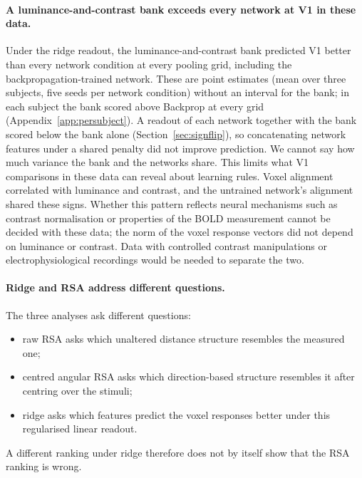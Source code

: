 \paragraph{A luminance-and-contrast bank exceeds every network at V1 in these data.}
Under the ridge readout, the luminance-and-contrast bank predicted V1 better than every
network condition at every pooling grid, including the backpropagation-trained network.
These are point estimates (mean over three subjects, five seeds per network condition)
without an interval for the bank; in each subject the bank scored above Backprop at every
grid (Appendix~\ref{app:persubject}). A readout of each network together with the bank
scored below the bank alone (Section~\ref{sec:signflip}), so concatenating network features under a shared penalty did not improve prediction. We cannot say how much variance the bank and the networks share.
This limits what V1 comparisons in these data can reveal about learning rules. Voxel
alignment correlated with luminance and contrast, and the untrained network's alignment
shared these signs. Whether this pattern reflects neural mechanisms such as contrast
normalisation \citep{carandini2012} or properties of the BOLD measurement cannot be decided
with these data; the norm of the voxel response vectors did not depend on luminance or
contrast. Data with controlled contrast manipulations or electrophysiological recordings
would be needed to separate the two.

\paragraph{Ridge and RSA address different questions.}
The three analyses ask different questions:
\begin{itemize}[nosep]
\item raw RSA asks which unaltered distance structure resembles the measured one;
\item centred angular RSA asks which direction-based structure resembles it after centring
  over the stimuli;
\item ridge asks which features predict the voxel responses better under this regularised
  linear readout.
\end{itemize}
A different ranking under ridge therefore does not by itself show that the RSA ranking is wrong.

